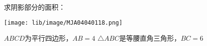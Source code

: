 求阴影部分的面积：

\begin{center}
    \texttt{[image: lib/image/MJA04040118.png]}
\end{center}

\begin{subquestions}
    \subquestion $ABCD$为平行四边形，$AB =4$
    \subquestion $\triangle$$ABC$是等腰直角三角形，$BC =6$

\end{subquestions}